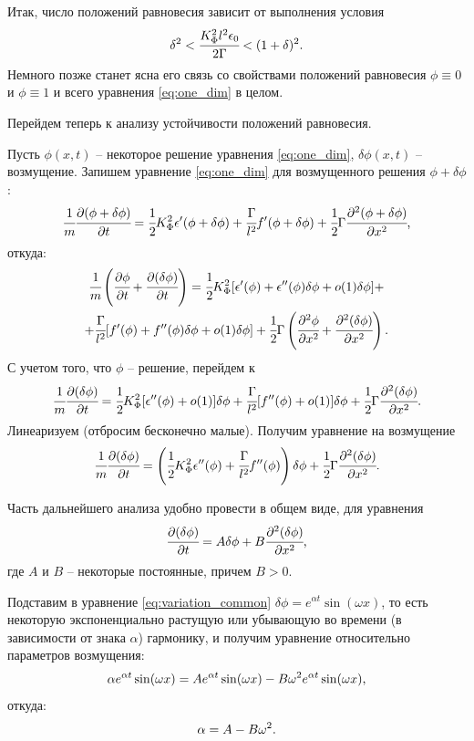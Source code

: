 Итак, число положений равновесия зависит от выполнения условия
\begin{equation}
	\delta^2 < \cfrac{K_\Phi^2 l^2 \epsilon_0}{2 \Gamma} < (1 + \delta)^2 {\text{.}}
	\label{cond:equilibriums_number}
\end{equation}
Немного позже станет ясна его связь со свойствами положений равновесия $\phi \equiv 0$ и $\phi \equiv 1$ и всего уравнения \eqref{eq:one_dim} в целом.

Перейдем теперь к анализу устойчивости положений равновесия.

Пусть $\phi(x, t)$ -- некоторое решение уравнения \eqref{eq:one_dim}, $\delta \phi(x, t)$ -- возмущение. Запишем уравнение \eqref{eq:one_dim} для возмущенного решения $\phi + \delta \phi$:
$$\cfrac{1}{m} \cfrac{\partial (\phi + \delta \phi)}{\partial t} = \cfrac{1}{2} K_\Phi^2 \epsilon'(\phi + \delta \phi) + \cfrac{\Gamma}{l^2} f'(\phi + \delta \phi) + \cfrac{1}{2} \Gamma \cfrac{\partial^2 (\phi + \delta \phi)}{\partial x^2} {\text{,}}$$
откуда:
\begin{multline*}
	\cfrac{1}{m} \left( \cfrac{\partial \phi}{\partial t} + \cfrac{\partial (\delta \phi)}{\partial t} \right) = \cfrac{1}{2} K_\Phi^2 [\epsilon'(\phi) + \epsilon''(\phi) \delta \phi + o(1) \delta \phi] + \\ + \cfrac{\Gamma}{l^2} [f'(\phi) + f''(\phi) \delta \phi + o(1) \delta \phi] + \cfrac{1}{2} \Gamma \left( \cfrac{\partial^2 \phi}{\partial x^2} + \cfrac{\partial^2 (\delta \phi)}{\partial x^2} \right) {\text{.}}
\end{multline*}
С учетом того, что $\phi$ -- решение, перейдем к
$$\cfrac{1}{m} \cfrac{\partial (\delta \phi)}{\partial t} = \cfrac{1}{2} K_\Phi^2 [\epsilon''(\phi) + o(1)] \delta \phi + \cfrac{\Gamma}{l^2} [f''(\phi) + o(1)] \delta \phi + \cfrac{1}{2} \Gamma \cfrac{\partial^2 (\delta \phi)}{\partial x^2} {\text{.}}$$
Линеаризуем (отбросим бесконечно малые). Получим уравнение на возмущение
\begin{equation}
	\cfrac{1}{m} \cfrac{\partial (\delta \phi)}{\partial t} = \left(\cfrac{1}{2} K_\Phi^2 \epsilon''(\phi) + \cfrac{\Gamma}{l^2} f''(\phi) \right) \delta \phi + \cfrac{1}{2} \Gamma \cfrac{\partial^2 (\delta \phi)}{\partial x^2} {\text{.}}
	\label{eq:variation}
\end{equation}

Часть дальнейшего анализа удобно провести в общем виде, для уравнения
\begin{equation}
	\cfrac{\partial (\delta \phi)}{\partial t} = A \delta \phi + B \cfrac{\partial^2 (\delta \phi)}{\partial x^2} {\text{,}}
	\label{eq:variation_common}
\end{equation}
где $A$ и $B$ -- некоторые постоянные, причем $B > 0$.

Подставим в уравнение \eqref{eq:variation_common} $\delta \phi = e^{\alpha t} \sin(\omega x)$, то есть некоторую экспоненциально растущую или убывающую во времени (в зависимости от знака $\alpha$) гармонику, и получим уравнение относительно параметров возмущения:
$$\alpha e^{\alpha t} \sin(\omega x) = A e^{\alpha t} \sin(\omega x) - B \omega^2 e^{\alpha t} \sin(\omega x) {\text{,}}$$
откуда:
\begin{equation}
	\alpha = A - B \omega^2 {\text{.}}
	\label{eq:exponent_coefficient}
\end{equation}

